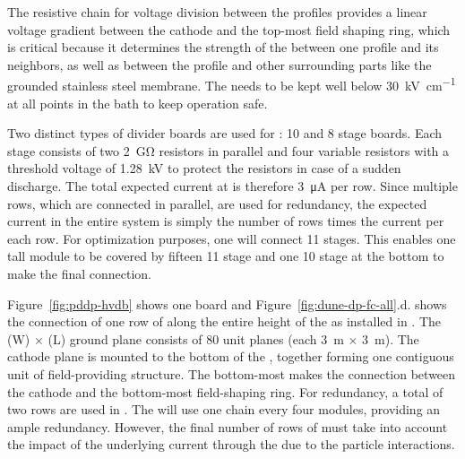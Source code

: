 The resistive chain for voltage division between the profiles provides a linear voltage gradient between the cathode and the top-most field shaping ring, which is critical because it determines the strength of the \efield between one profile and its neighbors, as well as between the profile and other surrounding parts like the grounded stainless steel membrane. The \efield needs to be kept well below \SI{30}{\kV\per\cm} at all points in the \lar bath to keep  operation safe.


Two distinct types of  divider boards are used for : \num{10} and \num{8} stage boards.  Each stage consists of two \SI{2}{\giga\ohm} resistors in parallel and four variable resistors with a threshold voltage of \SI{1.28}{kV} to protect the resistors in case of a sudden discharge.  The total expected current at \dptargetdriftvoltpos is therefore \SI{3}{\micro\ampere} per row.  Since multiple rows, which are connected in parallel, are used for redundancy, the expected current in the entire system is simply the number of rows times the current per each row.
For optimization purposes, one   will connect \num{11} stages.  This enables  one \tpcheight tall module to be covered by fifteen \num{11} stage  and one \num{10} stage  at the bottom to make the final connection.  

Figure~\ref{fig:pddp-hvdb} shows one   board and  Figure~\ref{fig:dune-dp-fc-all}.d. shows the connection of one row of  along the entire height of the  as installed in . The \dptpcwdth (W) $\times$ \dptpclen (L) ground plane consists of \num{80} unit planes (each \SI{3}{\m} $\times$ \SI{3}{\m}).  
The cathode plane is mounted to the bottom of the , together forming one contiguous unit of field-providing structure.  The bottom-most  makes the connection between the cathode and the bottom-most field-shaping ring.
For redundancy, a total of two  rows are used in .  
The \dpmod will use one  chain every four  modules, providing an ample redundancy.  However, the final number of rows of  must take into account the impact of the underlying current through the  due to the particle interactions.


